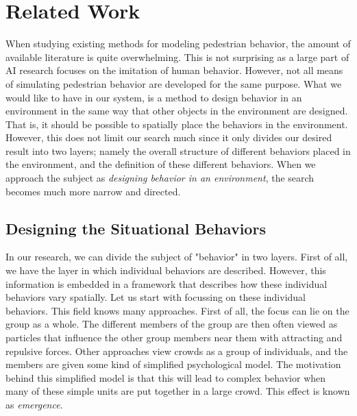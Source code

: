 \documentclass[11pt]{book}
\begin{document}
\section{Related Work}
When studying existing methods for modeling pedestrian behavior, the amount of available literature is quite overwhelming. This is not surprising as a large part of AI research focuses on the imitation of human behavior. However, not all means of simulating pedestrian behavior are developed for the same purpose. What we would like to have in our system, is a method to design behavior in an environment in the same way that other objects in the environment are designed. That is, it should be possible to spatially place the behaviors in the environment. However, this does not limit our search much since it only divides our desired result into two layers; namely the overall structure of different behaviors placed in the environment, and the definition of these different behaviors. When we approach the subject as \emph{designing behavior in an environment}, the search becomes much more narrow and directed.

\subsection{Designing the Situational Behaviors}
In our research, we can divide the subject of "behavior" in two layers.  First of all, we have the layer in which individual behaviors are described. However, this information is embedded in a framework that describes how these individual behaviors vary spatially. Let us start with focussing on these individual behaviors. This field knows many approaches. First of all, the focus can lie on the group as a whole. The different members of the group are then often viewed as particles that influence the other group members near them with attracting and repulsive forces. Other approaches view crowds as a group of individuals, and the members are given some kind of simplified psychological model. The motivation behind this simplified model is that this will lead to complex behavior when many of these simple units are put together in a large crowd. This effect is known as \emph{emergence}.\\
\end{document}
